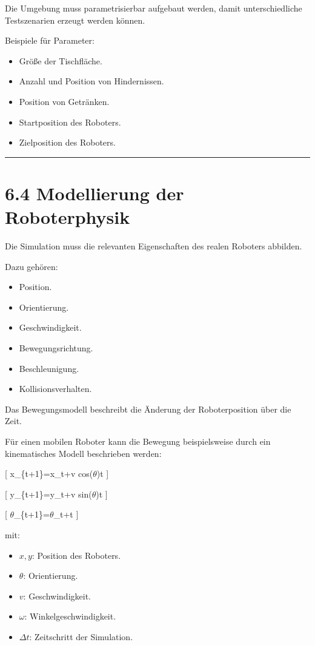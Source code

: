 \documentclass[
]{article}
\providecommand{\tightlist}{%
  \setlength{\itemsep}{0pt}\setlength{\parskip}{0pt}}
\begin{document}
Die Umgebung muss parametrisierbar aufgebaut werden, damit
unterschiedliche Testszenarien erzeugt werden können.

Beispiele für Parameter:

\begin{itemize}
\tightlist
\item
  Größe der Tischfläche.
\item
  Anzahl und Position von Hindernissen.
\item
  Position von Getränken.
\item
  Startposition des Roboters.
\item
  Zielposition des Roboters.
\end{itemize}

\begin{center}\rule{0.5\linewidth}{0.5pt}\end{center}

\section{6.4 Modellierung der
Roboterphysik}\label{modellierung-der-roboterphysik}

Die Simulation muss die relevanten Eigenschaften des realen Roboters
abbilden.

Dazu gehören:

\begin{itemize}
\tightlist
\item
  Position.
\item
  Orientierung.
\item
  Geschwindigkeit.
\item
  Bewegungsrichtung.
\item
  Beschleunigung.
\item
  Kollisionsverhalten.
\end{itemize}

Das Bewegungsmodell beschreibt die Änderung der Roboterposition über die
Zeit.

Für einen mobilen Roboter kann die Bewegung beispielsweise durch ein
kinematisches Modell beschrieben werden:

{[} x\_\{t+1\}=x\_t+v \cdot cos(\(\theta\))\cdot \Delta t {]}

{[} y\_\{t+1\}=y\_t+v \cdot sin(\(\theta\))\cdot \Delta t {]}

{[} \(\theta\)\_\{t+1\}=\(\theta\)\_t+\omega \cdot \Delta t {]}

mit:

\begin{itemize}
\tightlist
\item
  \(x,y\): Position des Roboters.
\item
  \(\theta\): Orientierung.
\item
  \(v\): Geschwindigkeit.
\item
  \(\omega\): Winkelgeschwindigkeit.
\item
  \(\Delta t\): Zeitschritt der Simulation.
\end{itemize}
\end{document}
